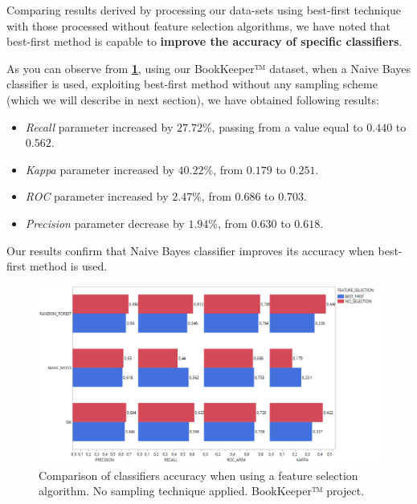 \documentclass[sigconf]{acmart}
\begin{document}
Comparing results derived by processing our data-sets using best-first technique with those processed without feature selection algorithms, we have noted that best-first method is capable to \textbf{improve the accuracy of specific classifiers}.
 
As you can observe from \textbf{\cref{BOOKKEEPER-FeatureSelection}}, using our BookKeeper™ dataset, when a Naive Bayes classifier is used, exploiting best-first method without any sampling scheme (which we will describe in next section), we have obtained following results:
\begin{itemize}
\item \textit{Recall} parameter increased by $27.72\%$, passing from a value equal to $0.440$ to $0.562$. 
\item \textit{Kappa} parameter increased by $40.22\%$, from $0.179$ to $0.251$. 
\item \textit{ROC} parameter increased by $2.47\%$, from $0.686$ to $0.703$.
\item \textit{Precision} parameter decrease by $1.94\%$, from $0.630$ to $0.618$.
\end{itemize}

Our results confirm that Naive Bayes classifier improves its accuracy when best-first method is used. 



\begin{figure}[h!]
  \centering
  \includegraphics[width=\textwidth]{./BOOKKEEPER/FeatureSelection.png}
  \caption{Comparison of classifiers accuracy when using a feature selection algorithm. No sampling technique applied. BookKeeper™ project.}
  \label{BOOKKEEPER-FeatureSelection}
\end{figure}
\end{document}
